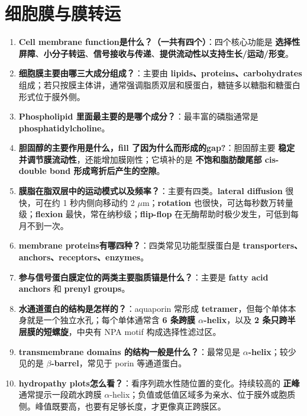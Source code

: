\documentclass[12pt,fontset=none]{ctexart}
\begin{document}
\section*{细胞膜与膜转运}
\begin{enumerate}
\item \textbf{Cell membrane function是什么？（一共有四个）}：四个核心功能是 \textbf{选择性屏障}、\textbf{小分子转运}、\textbf{信号接收与传递}、\textbf{提供流动性以支持生长/运动/形变}。

\item \textbf{细胞膜主要由哪三大成分组成？}：主要由 \textbf{lipids、proteins、carbohydrates} 组成；若只按膜主体讲，通常强调脂质双层和膜蛋白，糖链多以糖脂和糖蛋白形式位于膜外侧。

\item \textbf{Phospholipid 里面最主要的是哪个成分？}：最丰富的磷脂通常是 \textbf{phosphatidylcholine}。

\item \textbf{胆固醇的主要作用是什么，fill 了因为什么而形成的gap?}：胆固醇主要 \textbf{稳定并调节膜流动性}，还能增加膜刚性；它填补的是 \textbf{不饱和脂肪酸尾部 cis-double bond 形成弯折后产生的空隙}。

\item \textbf{膜脂在脂双层中的运动模式以及频率？}：主要有四类。\textbf{lateral diffusion} 很快，可在约 1 秒内侧向移动约 2 $\mu$m；\textbf{rotation} 也很快，可达每秒数万转量级；\textbf{flexion} 最快，常在纳秒级；\textbf{flip-flop} 在无酶帮助时极少发生，可低到每月不到一次。

\item \textbf{membrane proteins有哪四种？}：四类常见功能型膜蛋白是 \textbf{transporters、anchors、receptors、enzymes}。

\item \textbf{参与信号蛋白膜定位的两类主要脂质锚是什么？}：主要是 \textbf{fatty acid anchors} 和 \textbf{prenyl groups}。

\item \textbf{水通道蛋白的结构是怎样的？}：aquaporin 常形成 \textbf{tetramer}，但每个单体本身就是一个独立水孔；每个单体通常含 \textbf{6 条跨膜 $\alpha$-helix}，以及 \textbf{2 条只跨半层膜的短螺旋}，中央有 NPA motif 构成选择性滤过区。

\item \textbf{transmembrane domains 的结构一般是什么？}：最常见是 \textbf{$\alpha$-helix}；较少见的是 \textbf{$\beta$-barrel}，常见于 porin 等通道蛋白。

\item \textbf{hydropathy plots怎么看？}：看序列疏水性随位置的变化。持续较高的 \textbf{正峰} 通常提示一段疏水跨膜 $\alpha$-helix；负值或低值区域多为亲水、位于膜外或胞质侧。峰值既要高，也要有足够长度，才更像真正跨膜区。


\end{enumerate}
\end{document}
